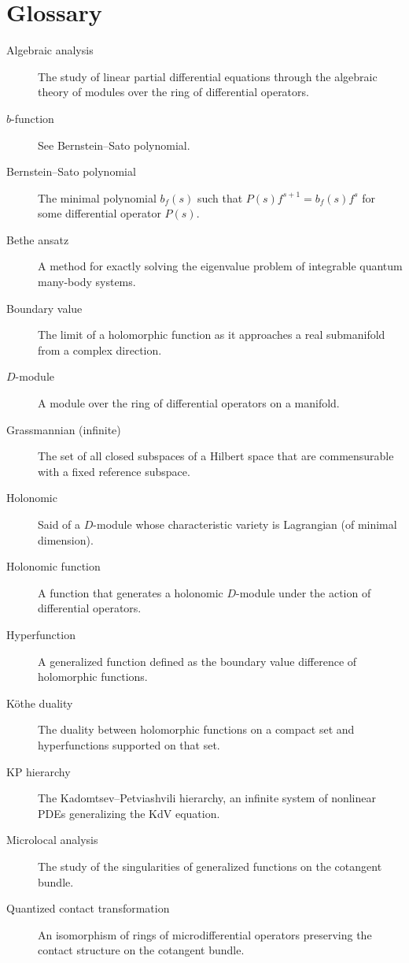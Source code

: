 \section*{Glossary}

\begin{description}
    \item[Algebraic analysis] The study of linear partial differential equations through the algebraic theory of modules over the ring of differential operators.
    \item[\(b\)-function] See Bernstein--Sato polynomial.
    \item[Bernstein--Sato polynomial] The minimal polynomial \(b_f(s)\) such that \(P(s) f^{s+1} = b_f(s) f^s\) for some differential operator \(P(s)\).
    \item[Bethe ansatz] A method for exactly solving the eigenvalue problem of integrable quantum many-body systems.
    \item[Boundary value] The limit of a holomorphic function as it approaches a real submanifold from a complex direction.
    \item[\(D\)-module] A module over the ring of differential operators on a manifold.
    \item[Grassmannian (infinite)] The set of all closed subspaces of a Hilbert space that are commensurable with a fixed reference subspace.
    \item[Holonomic] Said of a \(D\)-module whose characteristic variety is Lagrangian (of minimal dimension).
    \item[Holonomic function] A function that generates a holonomic \(D\)-module under the action of differential operators.
    \item[Hyperfunction] A generalized function defined as the boundary value difference of holomorphic functions.
    \item[K\"othe duality] The duality between holomorphic functions on a compact set and hyperfunctions supported on that set.
    \item[KP hierarchy] The Kadomtsev--Petviashvili hierarchy, an infinite system of nonlinear PDEs generalizing the KdV equation.
    \item[Microlocal analysis] The study of the singularities of generalized functions on the cotangent bundle.
    \item[Quantized contact transformation] An isomorphism of rings of microdifferential operators preserving the contact structure on the cotangent bundle.

\end{description}
